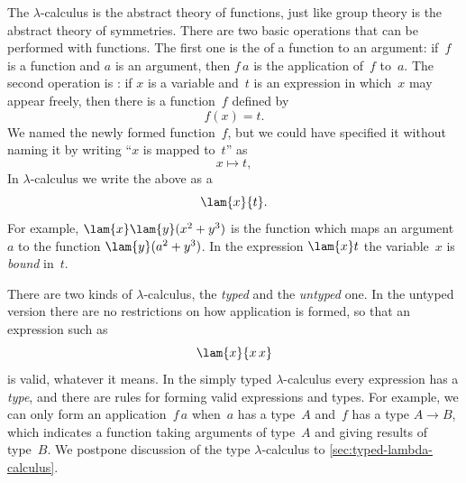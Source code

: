 The $\lambda$-calculus is the abstract theory of functions, just like
group theory is the abstract theory of symmetries. There are two basic
operations that can be performed with functions. The first one is the
 of a function to an argument: if~$f$ is a function
and $a$ is an argument, then $f\,a$ is the application of~$f$ to~$a$.
The second operation is : if $x$ is a variable
and~$t$ is an expression in which~$x$ may appear freely, then there is
a function~$f$ defined by
%
\begin{equation*}
  f(x) = t.
\end{equation*}
%
We named the newly formed function~$f$, but we could
have specified it without naming it by writing ``$x$ is mapped to~$t$'' as
%
\begin{equation*}
  x \mapsto t,
\end{equation*}
%
In $\lambda$-calculus we write the above as a 
%
\begin{equation*}
  \lam{x}{t}.
\end{equation*}
%
For example, $\lam{x} \lam{y} (x^2 + y^3)$ is the function which maps an
argument~$a$ to the function $\lam{y} (a^2 + y^3)$. In the expression
$\lam{x} t$ the variable~$x$ is \emph{bound} in~$t$.

There are two kinds of $\lambda$-calculus, the \emph{typed} and the
\emph{untyped} one. In the untyped version there are no restrictions
on how application is formed, so that an expression such as
%
\begin{equation*}
  \lam{x}{x\,x}
\end{equation*}
%
is valid, whatever it means. In the simply typed $\lambda$-calculus every
expression has a \emph{type}, and there are rules for forming valid
expressions and types. For example, we can only form an
application~$f\,a$ when~$a$ has a type~$A$ and~$f$ has a type $A \to
B$, which indicates a function taking arguments of type~$A$ and giving
results of type~$B$. We postpone discussion of the type
$\lambda$-calculus to \cref{sec:typed-lambda-calculus}.


